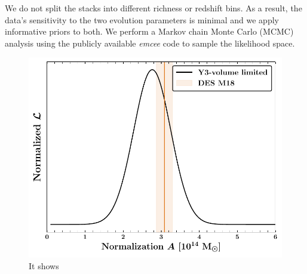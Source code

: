 We do not split the stacks into different richness or redshift bins.
As a result, the data's sensitivity to the two evolution parameters is minimal and we apply informative priors to both.
We perform a Markov chain Monte Carlo (MCMC) analysis %
using the publicly available \emph{emcee} \citep{mackey13} code to sample the likelihood space.
\begin{figure}
\includegraphics[width=\linewidth]{figs/M_rich_fitting_y3_v6_4_22_full_vl_JODY.pdf}
\caption{It shows}
\end{figure}
